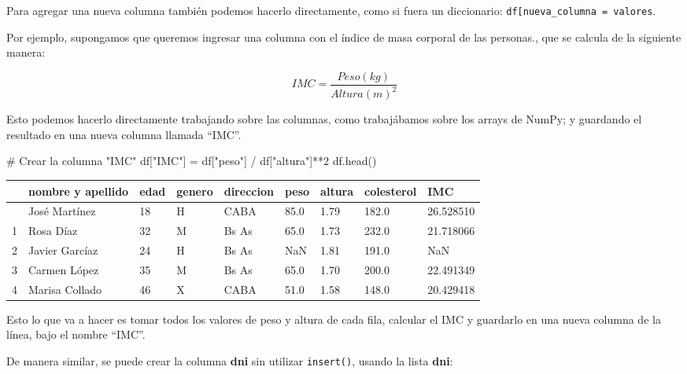 \documentclass[
  letterpaper,
  DIV=11,
  numbers=noendperiod]{scrreprt}
\newenvironment{Shaded}{\begin{snugshade}}{\end{snugshade}}
\newcommand{\CommentTok}[1]{\textcolor[rgb]{0.37,0.37,0.37}{#1}}
\newcommand{\DecValTok}[1]{\textcolor[rgb]{0.68,0.00,0.00}{#1}}
\newcommand{\NormalTok}[1]{\textcolor[rgb]{0.00,0.23,0.31}{#1}}
\newcommand{\OperatorTok}[1]{\textcolor[rgb]{0.37,0.37,0.37}{#1}}
\newcommand{\StringTok}[1]{\textcolor[rgb]{0.13,0.47,0.30}{#1}}
\begin{document}
Para agregar una nueva columna también podemos hacerlo directamente,
como si fuera un diccionario:
\texttt{df{[}\textquotesingle{}nueva\_columna\textquotesingle{}{]}\ =\ valores}.

Por ejemplo, supongamos que queremos ingresar una columna con el índice
de masa corporal de las personas., que se calcula de la siguiente
manera:

\[IMC = \frac{Peso(kg)}{Altura(m)^2}\]

Esto podemos hacerlo directamente trabajando sobre las columnas, como
trabajábamos sobre los arrays de NumPy; y guardando el resultado en una
nueva columna llamada ``IMC''.

\begin{Shaded}
\begin{Highlighting}[]
\CommentTok{\# Crear la columna "IMC"}
\NormalTok{df[}\StringTok{"IMC"}\NormalTok{] }\OperatorTok{=}\NormalTok{ df[}\StringTok{"peso"}\NormalTok{] }\OperatorTok{/}\NormalTok{ df[}\StringTok{"altura"}\NormalTok{]}\OperatorTok{**}\DecValTok{2}
\NormalTok{df.head()}
\end{Highlighting}
\end{Shaded}

\begin{longtable}[]{@{}lllllllll@{}}
\toprule\noalign{}
& nombre y apellido & edad & genero & direccion & peso & altura &
colesterol & IMC \\
\midrule\noalign{}
\endhead
\bottomrule\noalign{}
\endlastfoot
0 & José Martínez & 18 & H & CABA & 85.0 & 1.79 & 182.0 & 26.528510 \\
1 & Rosa Díaz & 32 & M & Bs As & 65.0 & 1.73 & 232.0 & 21.718066 \\
2 & Javier Garcíaz & 24 & H & Bs As & NaN & 1.81 & 191.0 & NaN \\
3 & Carmen López & 35 & M & Bs As & 65.0 & 1.70 & 200.0 & 22.491349 \\
4 & Marisa Collado & 46 & X & CABA & 51.0 & 1.58 & 148.0 & 20.429418 \\
\end{longtable}

Esto lo que va a hacer es tomar todos los valores de peso y altura de
cada fila, calcular el IMC y guardarlo en una nueva columna de la línea,
bajo el nombre ``IMC''.

De manera similar, se puede crear la columna \textbf{dni} sin utilizar
\texttt{insert()}, usando la lista \textbf{dni}:
\end{document}
